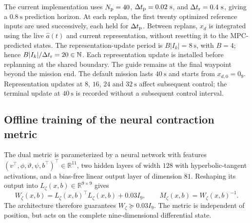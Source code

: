 \documentclass[11pt]{article}
\begin{document}
The current implementation uses $N_{\rm p}=40$,
$\Delta t_{\rm p}=0.02~\mathrm s$, and
$\Delta t_{\rm r}=0.4~\mathrm s$, giving a $0.8~\mathrm s$ prediction
horizon. At each replan, the first twenty optimized reference inputs
are used successively, each held for $\Delta t_{\rm p}$.
Between replans, $x_d$ is integrated using the live $\hat a(t)$ and
current representation, without resetting it to the MPC-predicted states.
The representation-update period is $B|I_k|=8~\mathrm s$, with $B=4$;
hence $B|I_k|/\Delta t_{\rm r}=20\in\mathbb N$.
Each representation update is installed before replanning at the shared
boundary. The guide remains at the final waypoint beyond the mission end.
The default mission lasts $40~\mathrm s$ and starts from $x_{d,0}=0_9$.
Representation updates at $8$, $16$, $24$ and $32~\mathrm s$ affect
subsequent control; the terminal update at $40~\mathrm s$ is recorded
without a subsequent control interval.

\subsection{Offline training of the neural contraction metric}

The dual metric is parameterized by a neural network with features
$(v^\top,\phi,\vartheta,\psi,b^\top)^\top\in\mathbb R^{11}$,
two hidden layers of width $128$ with hyperbolic-tangent activations,
and a bias-free linear output layer of dimension $81$.
Reshaping its output into $L_\zeta(x,b)\in\mathbb R^{9\times9}$ gives
\begin{equation}\label{eq:quad-neural-metric}
    W_\zeta(x,b)=L_\zeta(x,b)^\top L_\zeta(x,b)+0.03I_9,
    \qquad M_\zeta(x,b)=W_\zeta(x,b)^{-1}.
\end{equation}
The architecture therefore guarantees $W_\zeta\succeq0.03I_9$.
The metric is independent of position, but acts on the complete
nine-dimensional differential state.
\end{document}
